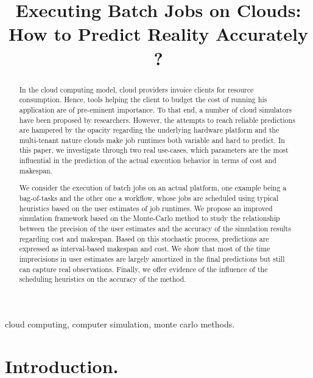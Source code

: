 \documentclass[10pt,conference,compsocconf]{IEEEtran}
\title{Executing Batch Jobs on Clouds: How to Predict Reality Accurately ?}
\author{\IEEEauthorblockN{Luke~Bertot 
			and Stéphane~Genaud 
			and Julien~Gossa}
	\IEEEauthorblockA{Icube-ICPS --- UMR 7357, Univeristé de Strasbourg, CNRS\\
		P\^ole API Blvd S. Bant, 67400 Illkirch\\
		email: \url{lbertot@unistra.fr}, \url{genaud@unistra.fr}, \url{gossa@unistra.fr}}
	}
\begin{document}
\maketitle

\begin{abstract}
  In the  cloud computing  model, cloud providers  invoice clients  for resource
  consumption. Hence, tools helping the client to budget the cost of running his
  application are  of pre-eminent  importance. To  that end,  a number  of cloud
  simulators have been  proposed by researchers. However, the  attempts to reach
  reliable  predictions are  hampered by  the opacity  regarding the  underlying
  hardware platform  and the  multi-tenant nature  clouds make job
  runtimes both  variable and hard to  predict.  In this paper,  we investigate
  through two real  use-cases, which parameters are the most  influential in the
  prediction of the actual execution behavior in terms of cost and makespan.

  We consider the execution  of batch jobs on an  actual platform, one example
  being a  bag-of-tasks and the other  one a workflow, whose  jobs are scheduled
  using typical  heuristics based on  the user  estimates of job  runtimes.  We
  propose an  improved simulation framework  based on the Monte-Carlo  method to
  study the  relationship between the  precision of  the user estimates  and the
  accuracy of the simulation results regarding  cost and makespan. Based on this
  stochastic process,  predictions are expressed as  interval-based makespan and
  cost.   We show  that  most  of the time imprecisions  in  user estimates are
  largely amortized in the final predictions but still can capture real
  observations. Finally, we offer evidence of the influence of the scheduling 
  heuristics on the accuracy of the method.
 
\end{abstract}

\begin{IEEEkeywords}
cloud computing, computer simulation, monte carlo methods.
\end{IEEEkeywords}

\section{Introduction.}
\end{document}
